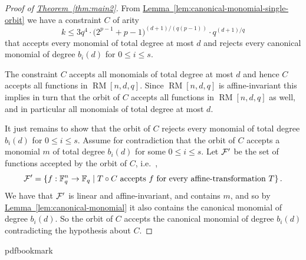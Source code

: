 \documentclass[10pt]{article}
\theoremstyle{definition}
\providecommand{\ie}{i.e.\ }
\numberwithin{equation}{section}
\newcommand{\expref}[2]{\texorpdfstring{\hyperref[#2]{#1~\ref{#2}}}{#1~\ref{#2}}}
\newcommand{\calf}{{\cal F}}
\newcommand{\F}{{\mathbb{F}}}
\newcommand{\mrm}{\mathop{\mathrm{RM}}}
\begin{document}
\begin{proof}[Proof of \expref{Theorem}{thm:main2}]
{}From \expref{Lemma}{lem:canonical-monomial-single-orbit}
we have a constraint $C$ of arity
\[k \leq 3q^4 \cdot \big(2^{p-1}+p-1\big)^{(d+1)/(q(p-1))} \cdot q^{(d+1)/q}\] that
accepts every monomial of total degree at most
$d$ and rejects every canonical monomial of degree $b_i(d)$ for $0 \leq i \leq s$.

%
%
The constraint $C$ accepts all monomials
of total degree at most $d$ and hence $C$ accepts all functions in $\mrm[n,d,q]$.
Since $\mrm[n,d,q]$ is affine-invariant this implies in turn that the orbit of $C$ accepts all functions in $\mrm[n,d,q]$ as well, and in particular all monomials of total degree at most $d$.

It just remains to show that the orbit of $C$ rejects every monomial of total degree $b_i(d)$ for $0 \leq i\leq s$.
Assume for contradiction that the orbit of $C$ accepts a monomial $m$ of total degree $b_i(d)$ for some
$0 \leq i \leq s$.
Let $\calf'$ be the set of functions accepted by the orbit of
$C$, \ie,
$$\calf' = \{f : \F_q^n \to \F_q \;|\;
\mbox{$T \circ C$~accepts~$f$~for~every~affine-transformation~$T\}$}\,.$$
We have that $\calf'$ is linear and affine-invariant, and contains $m$,
and so by \expref{Lemma}{lem:canonical-monomial} it also contains
the canonical monomial of degree $b_i(d)$. So the orbit of $C$ accepts the canonical monomial of degree $b_i(d)$ contradicting the
hypothesis about $C$.

%
%
\end{proof}
\clearpage
\begingroup\raggedright
%
%
%
%
%
\providecommand{\bibhead}[1]{}
%
\expandafter\ifx\csname pdfbookmark\endcsname\relax%
  \providecommand{\tocrefpdfbookmark}{}
\else\providecommand{\tocrefpdfbookmark}{%
   \hypertarget{tocreferences}{}%
   \pdfbookmark[1]{References}{tocreferences}}%
\fi
\end{document}
